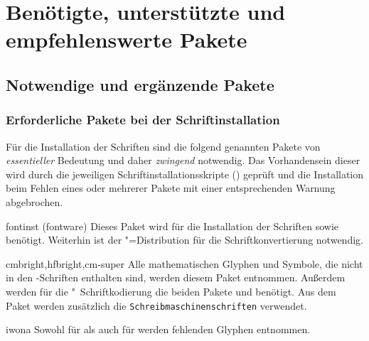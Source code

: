 \chapter{Benötigte, unterstützte und empfehlenswerte Pakete}
%
%
\section{Notwendige und ergänzende Pakete}
%
%
\subsection{Erforderliche Pakete bei der Schriftinstallation}
%
Für die Installation der Schriften sind die folgend genannten Pakete von
\emph{essentieller} Bedeutung und daher \emph{zwingend} notwendig. Das 
Vorhandensein dieser wird durch die jeweiligen Schriftinstallationsskripte
() geprüft und die Installation beim Fehlen eines 
oder mehrerer Pakete mit einer entsprechenden Warnung abgebrochen.
%
\begin{packages}
\item[fontinst](fontware)
  Dieses Paket wird für die Installation der Schriften \Univers sowie \DIN 
  benötigt. Weiterhin ist  der "=Distribution 
  für die Schriftkonvertierung notwendig.
\item[cmbright,hfbright,cm-super]
  Alle mathematischen Glyphen und Symbole, die nicht in den \Univers-Schriften 
  enthalten sind, werden diesem Paket entnommen. Außerdem werden für die 
  "~Schriftkodierung die beiden Pakete  und 
   benötigt. Aus dem Paket  werden 
  zusätzlich die \texttt{Schreibmaschinenschriften} verwendet.
\item[iwona]
  Sowohl für \Univers als auch für \DIN werden fehlenden Glyphen entnommen.
\end{packages}



